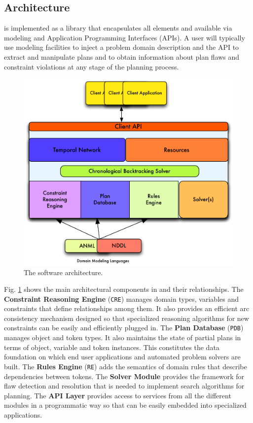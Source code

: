 \subsection{Architecture}
\label{sec:europa:arch}

\eu is implemented as a library that encapsulates all elements
 and available via modeling and
Application Programming Interfaces (APIs).  A user will typically use
modeling facilities to inject a problem domain description and the API
to extract and manipulate plans and to obtain information about plan
flaws and constraint violations at any stage of the planning process.

\begin{figure}[b]
\centering
\includegraphics[scale=0.5]{figs/EUROPA-Architecture.pdf}
\caption{\small The \eu software architecture.}
\label{fig:europa-architecture}
\end{figure}

Fig. \ref{fig:europa-architecture} shows the main architectural
components in \eu and their relationships. The \textbf{Constraint
  Reasoning Engine} (\texttt{CRE}) manages domain types, variables and
constraints that define relationships among them. It also provides an
efficient arc consistency mechanism \cite{mackworth77} designed so
that specialized reasoning algorithms for new constraints can be
easily and efficiently plugged in. The \textbf{Plan Database}
(\texttt{PDB}) manages object and token types. It also maintains the
state of partial plans in terms of object, variable and token
instances. This constitutes the data foundation on which end user
applications and automated problem solvers are built. The
\textbf{Rules Engine} (\texttt{RE}) adds the semantics of domain rules
that describe dependencies between tokens. The \textbf{Solver Module}
provides the framework for flaw detection and resolution that is
needed to implement search algorithms for planning. The \textbf{API
  Layer} provides access to services from all the different modules in
a programmatic way so that \eu can be easily embedded into specialized
applications.

